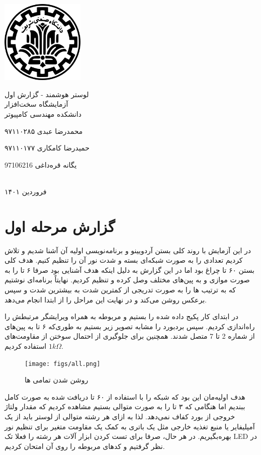 \documentclass[12pt,a4paper]{article}
\begin{document}
	\thispagestyle{empty}
	\vspace*{0mm}
	\centerline{\includegraphics[height=4cm]{logo.png}}
	\vspace*{5mm}
	\begin{center}
		{\yekan \Huge
لوستر هوشمند - گزارش اول
}
\\[1cm]
آزمایشگاه سخت‌افزار
\\[1cm]
دانشکده مهندسی کامپیوتر
\\[4cm]
{\large \traffic
محمدرضا عبدی ۹۷۱۱۰۲۸۵

حمیدرضا کامکاری ۹۷۱۱۰۱۷۷

یگانه قره‌داغی 97106216
}
	\\[5cm]
	فروردین ۱۴۰۱
	\end{center}
\newpage

\section*{گزارش مرحله اول}

در این آزمایش با روند کلی بستن آردویینو و برنامه‌نویسی اولیه‌ آن آشنا شدیم و تلاش کردیم تعدادی  را به صورت شبکه‌ای بسته و شدت نور آن را تنظیم کنیم. هدف کلی بستن ۶۰ تا چراغ  بود اما در این گزارش به دلیل اینکه هدف آشنایی بود صرفا ۶ تا  را به صورت موازی و به پین‌های مختلف وصل کرده و تنظیم کردیم. نهایتاً برنامه‌ای نوشتیم که به ترتیب  ها را به صورت تدریجی از کمترین شدت به بیشترین شدت و سپس برعکس روشن می‌کند و در نهایت این مراحل را از ابتدا انجام می‌دهد.

در ابتدای کار پکیج  داده شده را بستیم و  مربوطه به همراه ویرایشگر مرتبطش را راه‌اندازی کردیم. سپس بردبورد را مشابه تصویر زیر بستیم به طوری‌که ۶ تا  به پین‌های  از شماره 2 تا 7 متصل شدند. همچنین برای جلوگیری از احتمال سوختن  از مقاومت‌های $ 1k \Omega$ استفاده کردیم.
\begin{figure}[H]
	\centering
	\texttt{[image: figs/all.png]}
	\caption{روشن شدن تمامی  ها}
	\label{fig4}
\end{figure}

هدف اولیه‌مان این بود که شبکه را با استفاده از ۶۰ تا  دریافت شده به صورت کامل ببندیم اما هنگامی که ۳ تا  را به صورت متوالی بستیم مشاهده کردیم که مقدار ولتاژ خروجی از بورد  کفاف نمی‌دهد. لذا به ازای هر رشته متوالی از لوستر باید از یک آمپلیفایر یا منبع تغذیه خارجی مثل یک باتری به کمک یک مقاومت متغیر برای تنظیم نور بهره‌بگیریم. در هر حال، صرفا برای تست کردن ابزار آلات هر رشته را فعلا تک LED در نظر گرفتیم و کد‌های مربوطه را روی آن امتحان کردیم.
\end{document}
